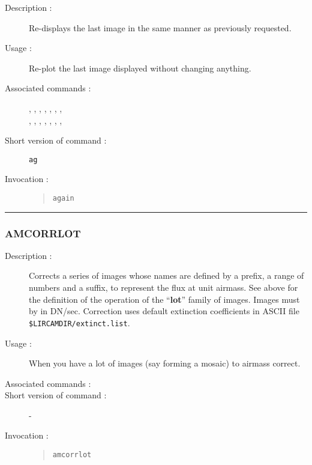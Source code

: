 \begin{description}

\item[Description :] Re-displays the last image in the same manner as
previously requested.

\item[Usage :] Re-plot the last image displayed without changing anything.

\item[Associated commands :] {\tt {}},
{\tt {}}, {\tt {}},
{\tt {}}, {\tt {}},
{\tt {}}, {\tt {}}, \\
{\tt {}}, {\tt {}},
{\tt {}}, {\tt {}},
{\tt {}}, {\tt {}},
{\tt {}}, {\tt {}}

\item[Short version of command :] {\tt ag}
\item[Invocation :]

\begin{quote}{\tt again }\end{quote}

\end{description}

\hrule
\subsubsection*{\label{AMCORRLOT}AMCORRLOT}

\begin{description}

\item[Description :] Corrects a series of images whose names are defined
by a prefix, a range of numbers and a suffix, to represent the flux at
unit airmass.  See above for the definition of the operation of the
``{\bf lot}'' family of images. Images must by in DN/sec.  Correction uses
default extinction coefficients in ASCII file {\tt \$LIRCAMDIR/extinct.list}.

\item[Usage :] When you have a lot of images (say forming a mosaic) to
airmass correct.

\item[Associated commands :] {\tt {}}
\item[Short version of command :] -
\item[Invocation :]

\begin{quote}{\tt  amcorrlot }\end{quote}

\end{description}

